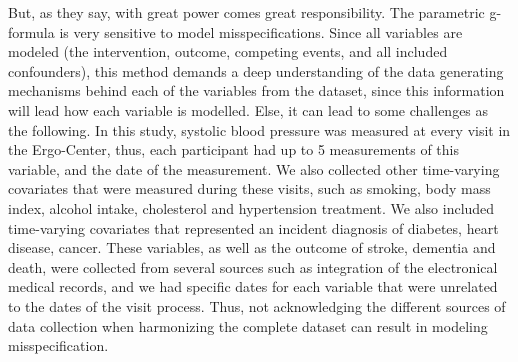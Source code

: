 \documentclass[
]{book}
\begin{document}
But, as they say, with great power comes great responsibility. The parametric g-formula is very sensitive to model misspecifications. Since all variables are modeled (the intervention, outcome, competing events, and all included confounders), this method demands a deep understanding of the data generating mechanisms behind each of the variables from the dataset, since this information will lead how each variable is modelled. Else, it can lead to some challenges as the following. In this study, systolic blood pressure was measured at every visit in the Ergo-Center, thus, each participant had up to 5 measurements of this variable, and the date of the measurement. We also collected other time-varying covariates that were measured during these visits, such as smoking, body mass index, alcohol intake, cholesterol and hypertension treatment. We also included time-varying covariates that represented an incident diagnosis of diabetes, heart disease, cancer. These variables, as well as the outcome of stroke, dementia and death, were collected from several sources such as integration of the electronical medical records, and we had specific dates for each variable that were unrelated to the dates of the visit process. Thus, not acknowledging the different sources of data collection when harmonizing the complete dataset can result in modeling misspecification.
\end{document}
